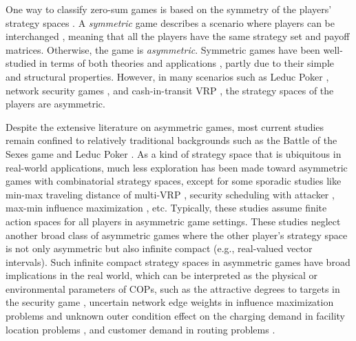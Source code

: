 
One way to classify zero-sum games is based on the symmetry of the players' strategy spaces \citep{amir2008symmetric, cox2013provision, stella2018bio}. A \textit{symmetric} game describes a scenario where players can be interchanged \citep{cheng2004notes}, meaning that all the players have the same strategy set and payoff matrices. Otherwise, the game is \textit{asymmetric}. Symmetric games have been well-studied in terms of both theories \citep{tuyls2018symmetric, hefti2017equilibria} and applications \citep{bichler2021learning, altman2011symmetric}, partly due to their simple and structural properties. However, in many scenarios such as Leduc Poker \citep{tuyls2018generalised}, network security games \citep{wilder2018equilibrium}, and cash-in-transit VRP \citep{ghannadpour2020new}, the strategy spaces of the players are asymmetric.


Despite the extensive literature on asymmetric games, most current studies remain confined to relatively traditional backgrounds such as the Battle of the Sexes game \citep{tuyls2018symmetric} and Leduc Poker \citep{tuyls2018generalised}. As a kind of strategy space that is ubiquitous in real-world applications, much less exploration has been made toward asymmetric games with combinatorial strategy spaces, except for some sporadic studies like min-max traveling distance of multi-VRP \citep{narasimha2013ant}, security scheduling with attacker \citep{jain2011double}, max-min influence maximization \citep{chen2016robust}, etc. Typically, these studies assume finite action spaces for all players in asymmetric game settings. These studies neglect another broad class of asymmetric games where the other player's strategy space is not only asymmetric but also infinite compact (e.g., real-valued vector intervals). Such infinite compact strategy spaces in asymmetric games have broad implications in the real world, which can be interpreted as the physical or environmental parameters of COPs, such as the attractive degrees to targets in the security game \citep{xu2021robust}, uncertain network edge weights in influence maximization problems \citep{kalimeris2019robust} and  
 unknown outer condition effect on the charging demand in facility location problems \citep{an2020battery, TIRKOLAEE2020340}, and customer demand in routing problems \citep{FLORIO20231081}.

